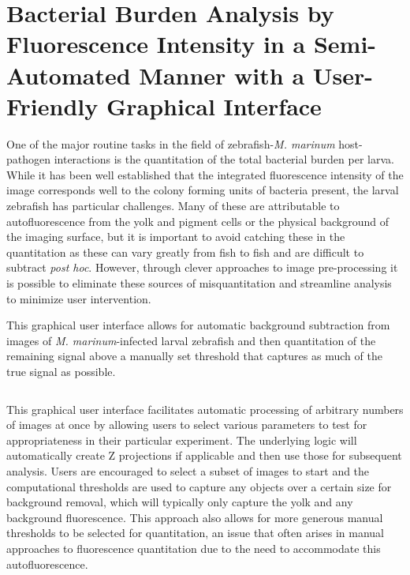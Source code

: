 \section{Bacterial Burden Analysis by Fluorescence Intensity in a Semi-Automated Manner with a User-Friendly Graphical Interface}

One of the major routine tasks in the field of zebrafish-\textit{M. marinum} host-pathogen interactions is the quantitation of the total bacterial burden per larva. While it has been well established that the integrated fluorescence intensity of the image corresponds well to the colony forming units of bacteria present, the larval zebrafish has particular challenges. Many of these are attributable to autofluorescence from the yolk and pigment cells or the physical background of the imaging surface, but it is important to avoid catching these in the quantitation as these can vary greatly from fish to fish and are difficult to subtract \textit{post hoc}. However, through clever approaches to image pre-processing it is possible to eliminate these sources of misquantitation and streamline analysis to minimize user intervention.

\begin{code}
\caption{This graphical user interface allows for automatic background subtraction from images of \textit{M. marinum}-infected larval zebrafish and then quantitation of the remaining signal above a manually set threshold that captures as much of the true signal as possible.}
\label{burden}

\inputminted[breaklines,frame=single,fontsize=\small]{python}{source/burdenMeasurer.py}

\end{code}

This graphical user interface facilitates automatic processing of arbitrary numbers of images at once by allowing users to select various parameters to test for appropriateness in their particular experiment. The underlying logic will automatically create Z projections if applicable and then use those for subsequent analysis. Users are encouraged to select a subset of images to start and the computational thresholds are used to capture any objects over a certain size for background removal, which will typically only capture the yolk and any background fluorescence. This approach also allows for more generous manual thresholds to be selected for quantitation, an issue that often arises in manual approaches to fluorescence quantitation due to the need to accommodate this autofluorescence. 


